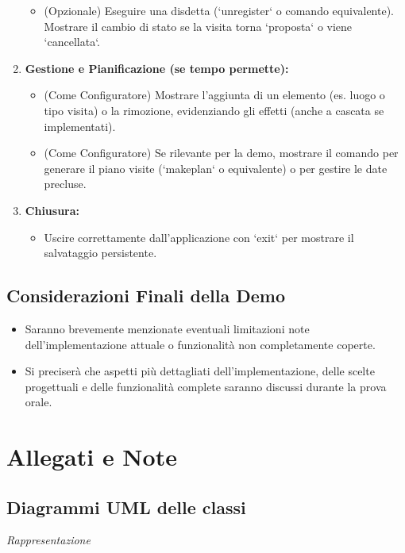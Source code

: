 \documentclass[a4paper,12pt]{article}
\begin{document}
\begin{enumerate}
\begin{itemize}
            \item (Opzionale) Eseguire una disdetta (`unregister` o comando equivalente). Mostrare il cambio di stato se la visita torna `proposta` o viene `cancellata`.
        \end{itemize}
     \item \textbf{Gestione e Pianificazione (se tempo permette):}
         \begin{itemize}
             \item (Come Configuratore) Mostrare l'aggiunta di un elemento (es. luogo o tipo visita) o la rimozione, evidenziando gli effetti (anche a cascata se implementati).
             \item (Come Configuratore) Se rilevante per la demo, mostrare il comando per generare il piano visite (`makeplan` o equivalente) o per gestire le date precluse.
         \end{itemize}
    \item \textbf{Chiusura:}
        \begin{itemize}
        \item Uscire correttamente dall'applicazione con `exit` per mostrare il salvataggio persistente.
        \end{itemize}
\end{enumerate}

\subsection{Considerazioni Finali della Demo}
\begin{itemize}
    \item Saranno brevemente menzionate eventuali limitazioni note dell'implementazione attuale o funzionalità non completamente coperte.
    \item Si preciserà che aspetti più dettagliati dell'implementazione, delle scelte progettuali e delle funzionalità complete saranno discussi durante la prova orale.
\end{itemize}

\newpage
\section{Allegati e Note}

\subsection{Diagrammi UML delle classi}
\textit{Rappresentazione }
\end{document}
